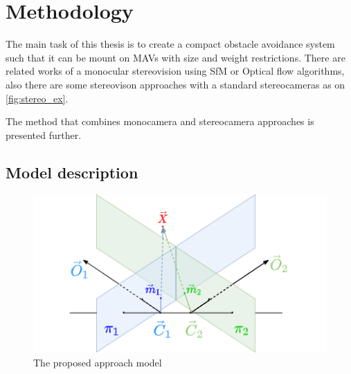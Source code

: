 \chapter{Methodology}

\label{chapter:methodology}


The main task of this thesis is to create a compact obstacle avoidance system such that it can be mount on MAVs with size and weight restrictions.
There are related works of a monocular stereovision using SfM or Optical flow algorithms, also there are some stereovison approaches with a standard stereocameras as on \autoref{fig:stereo_ex}.

The method that combines monocamera and stereocamera approaches is presented further.

\section{Model description}

\begin{figure}[h]
    \centering
    \includegraphics[width=.7\textwidth]{graphics/td90deg.png}
    \caption{The proposed approach model}
    \label{fig:td90deg}
\end{figure}


